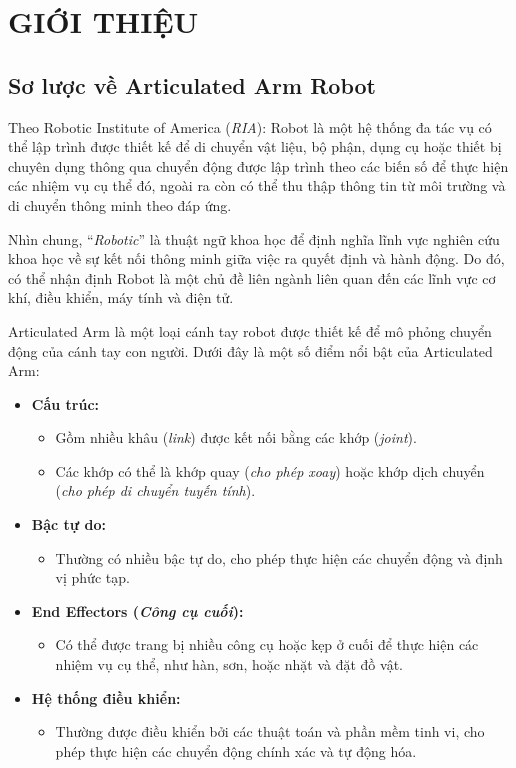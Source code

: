 \section{GIỚI THIỆU}
\subsection{Sơ lược về Articulated Arm Robot}
Theo Robotic Institute of America (\textit{RIA}): Robot là một hệ thống đa tác vụ có thể lập trình được thiết kế để di chuyển vật liệu, bộ phận, dụng cụ hoặc thiết bị chuyên dụng thông qua chuyển động được lập trình theo các biến số để thực hiện các nhiệm vụ cụ thể đó, ngoài ra còn có thể thu thập thông tin từ môi trường và di chuyển thông minh theo đáp ứng.

Nhìn chung, “\textit{Robotic}” là thuật ngữ khoa học để định nghĩa lĩnh vực nghiên cứu khoa học về sự kết nối thông minh giữa việc ra quyết định và hành động. Do đó, có thể nhận định Robot là một chủ đề liên ngành liên quan đến các lĩnh vực cơ khí, điều khiển, máy tính và điện tử.

Articulated Arm là một loại cánh tay robot được thiết kế để mô phỏng chuyển động của cánh tay con người. Dưới đây là một số điểm nổi bật của Articulated Arm:
\begin{itemize}
    \item \textbf{Cấu trúc:}
    \begin{itemize}
        \item Gồm nhiều khâu (\textit{link}) được kết nối bằng các khớp (\textit{joint}).
        \item Các khớp có thể là khớp quay (\textit{cho phép xoay}) hoặc khớp dịch chuyển (\textit{cho phép di chuyển tuyến tính}).
    \end{itemize}
    \item \textbf{Bậc tự do:}
    \begin{itemize}
        \item Thường có nhiều bậc tự do, cho phép thực hiện các chuyển động và định vị phức tạp.
    \end{itemize}
    \item \textbf{End Effectors (\textit{Công cụ cuối}):}
    \begin{itemize}
        \item Có thể được trang bị nhiều công cụ hoặc kẹp ở cuối để thực hiện các nhiệm vụ cụ thể, như hàn, sơn, hoặc nhặt và đặt đồ vật.
    \end{itemize}
    \item \textbf{Hệ thống điều khiển:}
    \begin{itemize}
        \item Thường được điều khiển bởi các thuật toán và phần mềm tinh vi, cho phép thực hiện các chuyển động chính xác và tự động hóa.
    \end{itemize}
\end{itemize}

